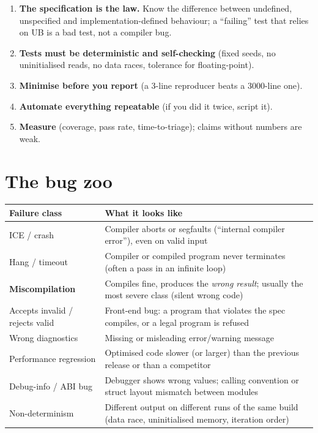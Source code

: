 \documentclass[10pt,a4paper,openany,oneside]{report}
\newcommand{\prio}[1]{\texorpdfstring{\ifcase#1\or{\color{gold}\ding{72}}\or{\color{gold}\ding{72}\ding{72}}\or{\color{gold}\ding{72}\ding{72}\ding{72}}\fi}{}}
\begin{document}
\begin{mustbox}
\begin{enumerate}[nosep]
\item \textbf{The specification is the law.} Know the difference between undefined, unspecified and implementation-defined behaviour; a ``failing'' test that relies on UB is a bad test, not a compiler bug.
\item \textbf{Tests must be deterministic and self-checking} (fixed seeds, no uninitialised reads, no data races, tolerance for floating-point).
\item \textbf{Minimise before you report} (a 3-line reproducer beats a 3000-line one).
\item \textbf{Automate everything repeatable} (if you did it twice, script it).
\item \textbf{Measure} (coverage, pass rate, time-to-triage); claims without numbers are weak.
\end{enumerate}
\end{mustbox}

\section{The bug zoo \prio{3}}
\begin{center}
\small
\begin{xltabular}{\textwidth}{@{}L{3.1cm}Y@{}}
\toprule
\textbf{Failure class} & \textbf{What it looks like}\\
\midrule\endhead
ICE / crash & Compiler aborts or segfaults (``internal compiler error''), even on valid input\\
Hang / timeout & Compiler or compiled program never terminates (often a pass in an infinite loop)\\
\textbf{Miscompilation} & Compiles fine, produces the \emph{wrong result}; usually the most severe class (silent wrong code)\\
Accepts invalid / rejects valid & Front-end bug: a program that violates the spec compiles, or a legal program is refused\\
Wrong diagnostics & Missing or misleading error/warning message\\
Performance regression & Optimised code slower (or larger) than the previous release or than a competitor\\
Debug-info / ABI bug & Debugger shows wrong values; calling convention or struct layout mismatch between modules\\
Non-determinism & Different output on different runs of the same build (data race, uninitialised memory, iteration order)\\
\bottomrule
\end{xltabular}
\end{center}
\end{document}
